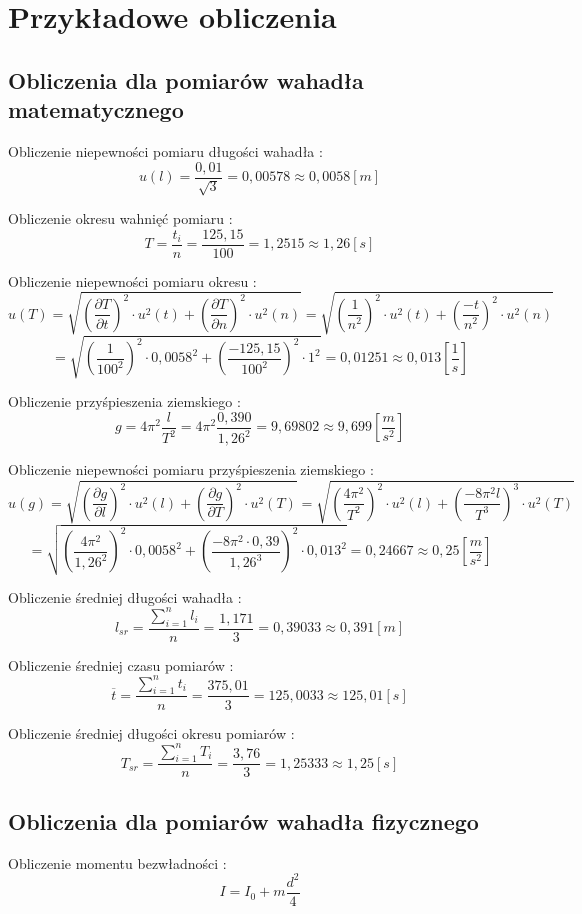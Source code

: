 \documentclass[12pt]{article}
\begin{document}
\section{Przykładowe obliczenia}

\subsection{Obliczenia dla pomiarów wahadła matematycznego}

Obliczenie niepewności pomiaru długości wahadła :
$$ u(l) = \frac{0,01}{\sqrt{3}} = 0,00578 \approx 0,0058[m] $$

Obliczenie okresu wahnięć pomiaru :
$$ T = \frac{t_i}{n} = \frac{125,15}{100} = 1,2515 \approx 1,26[s] $$

Obliczenie niepewności pomiaru okresu : 
$$ u(T) = \sqrt{ \left( \frac{\partial T}{\partial t} \right)^2 \cdot u^2(t) + \left( \frac{\partial T}{\partial n} \right)^2 \cdot u^2(n) }
= \sqrt{ \left( \frac{1}{n^2} \right)^2 \cdot u^2(t) + \left( \frac{-t}{n^2} \right)^2 \cdot u^2(n) } $$
$$ = \sqrt{ \left( \frac{1}{100^2} \right)^2 \cdot 0,0058^2 + \left( \frac{-125,15}{100^2} \right)^2 \cdot 1^2 } = 0,01251 \approx 0,013 \left[ \frac{1}{s} \right]$$

Obliczenie przyśpieszenia ziemskiego : 
$$ g = 4\pi^2 \frac{l}{T^2} = 4\pi^2 \frac{0,390}{1,26^2} = 9,69802 \approx 9,699 \left[ \frac{m}{s^2} \right] $$

Obliczenie niepewności pomiaru przyśpieszenia ziemskiego :
$$ u(g) = \sqrt{ \left( \frac{\partial g}{\partial l} \right)^2 \cdot u^2(l) + \left( \frac{\partial g}{\partial T} \right)^2 \cdot u^2(T) }
= \sqrt{ \left( \frac{4 \pi^2}{T^2} \right)^2 \cdot u^2(l) + \left( \frac{-8 \pi^2 l}{T^3} \right)^3 \cdot u^2(T) } $$
$$ = \sqrt{ \left( \frac{4\pi^2}{1,26^2} \right)^2 \cdot 0,0058^2 + \left( \frac{-8\pi^2 \cdot 0,39}{1,26^3} \right)^2 \cdot 0,013^2 }
= 0,24667 \approx 0,25 \left[ \frac{m}{s^2} \right] $$

Obliczenie średniej długości wahadła :
$$ l_{sr} = \frac{\sum\limits_{i=1}^{n} l_i}{n} = \frac{1,171}{3} = 0,39033 \approx 0,391[m]$$

Obliczenie średniej czasu pomiarów : 
$$ \overline{t} = \frac{\sum\limits_{i=1}^{n} t_i}{n} = \frac{375,01}{3} = 125,0033 \approx 125,01[s] $$

Obliczenie średniej długości okresu pomiarów :
$$ T_{sr} = \frac{\sum\limits_{i = 1}^{n} T_i}{n} = \frac{3,76}{3} = 1,25333 \approx 1,25[s] $$

\subsection{Obliczenia dla pomiarów wahadła fizycznego}

Obliczenie momentu bezwładności :
$$ I = I_0 + m \frac{d^2}{4} $$
\end{document}
